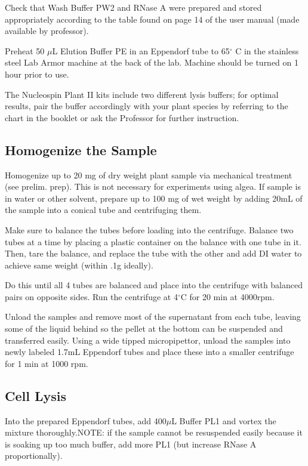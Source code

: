 \documentclass[12pt]{../SOP3_alpha}\usepackage[]{graphicx}\usepackage[]{color}
\begin{document}
\NP	Check that Wash Buffer PW2 and RNase A were prepared and stored appropriately according to the table found on page 14 of the user manual (made available by professor).

\NP Preheat 50 $\mu$L Elution Buffer PE in an Eppendorf tube to 65$^\circ$ C in the stainless steel Lab Armor machine at the back of the lab. Machine should be turned on 1 hour prior to use.

\NP The Nucleospin Plant II kits include two different lysis buffers; for optimal results, pair the buffer accordingly with your plant species by referring to the chart in the booklet or ask the Professor for further instruction. 


\subsection*{Homogenize the Sample}

\NP Homogenize up to 20 mg of dry weight plant sample via mechanical treatment (see prelim. prep). This is not necessary for experiments using algea. If sample is in water or other solvent, prepare up to 100 mg of wet weight by adding 20mL of the sample into a conical tube and centrifuging them. 

\NP Make sure to balance the tubes before loading into the centrifuge. Balance two tubes at a time by placing a plastic container on the balance with one tube in it. Then, tare the balance, and replace the tube with the other and add DI water to achieve same weight (within .1g ideally).

\NP Do this until all 4 tubes are balanced and place into the centrifuge with balanced pairs on opposite sides. Run the centrifuge at 4$^\circ$C for 20 min at 4000rpm.

\NP Unload the samples and remove most of the supernatant from each tube, leaving some of the liquid behind so the pellet at the bottom can be suspended and transferred easily. Using a wide tipped micropipettor, unload the samples into newly labeled 1.7mL Eppendorf tubes and place these into a smaller centrifuge for 1 min at 1000 rpm.


\subsection*{Cell Lysis}

\NP Into the prepared Eppendorf tubes, add 400$\mu$L Buffer PL1 and vortex the mixture thoroughly.NOTE: if the sample cannot be resuspended easily because it is soaking up too much buffer, add more PL1 (but increase RNase A proportionally).
\end{document}
